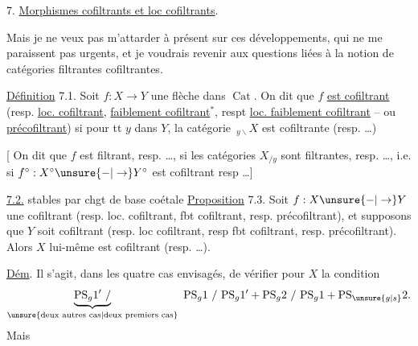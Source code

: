 7. \uline{Morphismes cofiltrants et loc cofiltrants}.

Mais je ne veux pas m'attarder à présent sur
ces développements, qui ne me paraissent pas
urgents, et je voudrais revenir aux questions
liées à la notion de catégories filtrantes 
cofiltrantes.

\uline{Définition} 7.1. Soit $f:X\to Y$ une flèche dans $\operatorname{Cat}$.
On dit que $f$ \uline{est cofiltrant} (resp. \uline{loc. cofiltrant},
\uline{faiblement cofiltrant}$^{*}$, respt \uline{loc. faiblement cofiltrant}
-- ou \uline{précofiltrant}) si pour tt $y$ dans
$Y$, la catégorie  $\,{}_{y\backslash}X$ est cofiltrante (resp. \ldots)

[ On dit que $f$ est filtrant, resp. \ldots, si les
catégories $X_{/y}$ sont filtrantes, resp. \ldots, i.e.
si $f^\circ:X^\circ\unsure{-|\to}Y^\circ$ est cofiltrant resp \ldots]

 \uline{ 7.2.}  stables par chgt de base coétale
\uline{Proposition} 7.3. Soit $f:X\unsure{-|\to}Y$ une 
cofiltrant (resp. loc. cofiltrant,  fbt cofiltrant,
resp.  précofiltrant), et supposons
que $Y$ soit cofiltrant (resp. loc cofiltrant,
resp fbt cofiltrant, resp. précofiltrant). Alors
$X$ lui-même est cofiltrant (resp. \ldots).

\uline{Dém}. Il s'agit, dans les quatre cas
envisagés, de vérifier pour $X$ la condition
\[
\underbrace{\mathrm{PS}_g1'\ /}_{\text{\unsure{deux autres cas|deux premiers cas}}}
\ \mathrm{PS}_g1\ /\ \mathrm{PS}_g1'+\mathrm{PS}_g2\ /\ \mathrm{PS}_g1+\mathrm{PS}_{\unsure{g|s}}2.
\]
Mais
